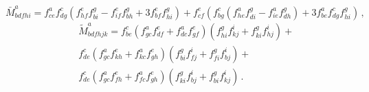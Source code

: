 \documentclass[a4paper,10pt]{article}
\begin{document}
\begin{equation}
\label{22a}
\bar{M}_{bdfhi}^{a}=f_{ce}^{a}f_{dg}^{c}\left(
f_{hf}^{e}f_{bi}^{g}-f_{if}^{e}f_{bh}^{g}+3f_{bf}^{e}f_{hi}^{g}\right)
+f_{cf}^{e}\left( f_{bg}^{c}\left(
f_{he}^{a}f_{di}^{g}-f_{ie}^{a}f_{dh}^{g}\right)
+3f_{be}^{a}f_{dg}^{c}f_{hi}^{g}\right) \,,
\end{equation}
\begin{eqnarray}
\label{22b}
&&\tilde{M}_{bdfhjk}^{a}=f_{be}^{c}\left(
f_{gc}^{a}f_{df}^{e}+f_{dc}^{a}f_{gf}^{e}\right) \left(
f_{hi}^{g}f_{kj}^{i}+f_{ki}^{g}f_{hj}^{i}\right) +  \nonumber \\
&&f_{de}^{c}\left( f_{gc}^{a}f_{kh}^{e}+f_{kc}^{a}f_{gh}^{e}\right)
\left( f_{bi}^{g}f_{fj}^{i}+f_{fi}^{g}f_{bj}^{i}\right) +
\nonumber \\
&&f_{de}^{c}\left( f_{gc}^{a}f_{fh}^{e}+
f_{fc}^{a}f_{gh}^{e}\right) \left(
f_{ki}^{g}f_{bj}^{i}+f_{bi}^{g}f_{kj}^{i}\right) \,.
\end{eqnarray}
\end{document}
